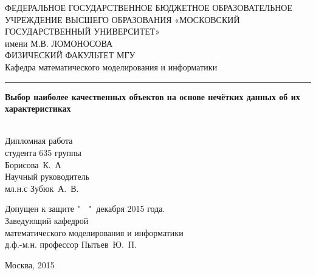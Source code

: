
\begin{titlepage}

\begin{center}
\vfill

ФЕДЕРАЛЬНОЕ ГОСУДАРСТВЕННОЕ БЮДЖЕТНОЕ ОБРАЗОВАТЕЛЬНОЕ 
УЧРЕЖДЕНИЕ ВЫСШЕГО ОБРАЗОВАНИЯ 
«МОСКОВСКИЙ ГОСУДАРСТВЕННЫЙ УНИВЕРСИТЕТ» \\
имени М.В. ЛОМОНОСОВА
\ \\[1ex]
ФИЗИЧЕСКИЙ ФАКУЛЬТЕТ МГУ
\ \\[0.8ex]
Кафедра математического моделирования и информатики
\ \\[1.8ex] 
\hrule 

\vfill

{\large\bf Выбор наиболее качественных объектов на основе нечётких данных об их характеристиках \\}
\ \\[2ex]
\begin{flushright}
\begin{minipage}{0.35\textwidth}
Дипломная работа  \\ студента 635 группы \\ Борисова~К.~А
\\[1ex]
Научный руководитель \\ мл.н.с Зубюк~А.~В.
\end{minipage}
\end{flushright}

\vfill
\end{center}
\hspace{3em}\begin{minipage}{0.65\textwidth}
Допущен к защите "\ \  "\  декабря 2015 года.
\\[1ex]
Заведующий кафедрой \\
математического моделирования и информатики \\ 
д.ф.-м.н. профессор Пытьев~Ю.~П.
\end{minipage}

\vfill
\begin{center}
Москва, 2015
\end{center}

\end{titlepage}